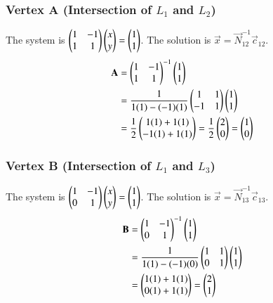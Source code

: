 \documentclass[journal]{IEEEtran}
\begin{document}
\subsubsection*{Vertex A (Intersection of $L_1$ and $L_2$)}
The system is $\begin{pmatrix}1 & -1 \\ 1 & 1\end{pmatrix} \begin{pmatrix}x \\ y\end{pmatrix} = \begin{pmatrix}1 \\ 1\end{pmatrix}$. The solution is $\vec{x} = \vec{N}_{12}^{-1}\vec{c}_{12}$.
\begin{align}  
\mathbf{A} &= \begin{pmatrix}1 & -1 \\ 1 & 1\end{pmatrix}^{-1} \begin{pmatrix}1 \\ 1\end{pmatrix} \\
&= \frac{1}{1(1) - (-1)(1)} \begin{pmatrix}1 & 1 \\ -1 & 1\end{pmatrix} \begin{pmatrix}1 \\ 1\end{pmatrix} \\
&= \frac{1}{2} \begin{pmatrix}1(1) + 1(1) \\ -1(1) + 1(1)\end{pmatrix} = \frac{1}{2} \begin{pmatrix}2 \\ 0\end{pmatrix} = \begin{pmatrix}1 \\ 0\end{pmatrix}
\end{align}  

\subsubsection*{Vertex B (Intersection of $L_1$ and $L_3$)}
The system is $\begin{pmatrix}1 & -1 \\ 0 & 1\end{pmatrix} \begin{pmatrix}x \\ y\end{pmatrix} = \begin{pmatrix}1 \\ 1\end{pmatrix}$. The solution is $\vec{x} = \vec{N}_{13}^{-1}\vec{c}_{13}$.
\begin{align}  
\mathbf{B} &= \begin{pmatrix}1 & -1 \\ 0 & 1\end{pmatrix}^{-1} \begin{pmatrix}1 \\ 1\end{pmatrix} \\
&= \frac{1}{1(1) - (-1)(0)} \begin{pmatrix}1 & 1 \\ 0 & 1\end{pmatrix} \begin{pmatrix}1 \\ 1\end{pmatrix} \\
&= \begin{pmatrix}1(1) + 1(1) \\ 0(1) + 1(1)\end{pmatrix} = \begin{pmatrix}2 \\ 1\end{pmatrix}
\end{align}  
\end{document}
